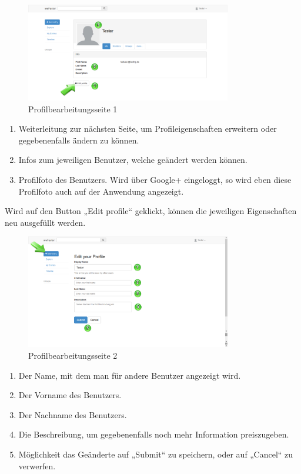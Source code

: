 \begin{figure}[H]
    \centering
    \includegraphics[width=0.8\textwidth]{Bilder/9.png}
    \caption{Profilbearbeitungsseite 1}
    \label{fig:profilbearbeitungsseite1}
\end{figure}


\begin{enumerate}
\item Weiterleitung zur nächsten Seite, um Profileigenschaften erweitern oder gegebenenfalls ändern zu können.
\item Infos zum jeweiligen Benutzer, welche geändert werden können.
\item Profilfoto des Benutzers. Wird über Google+ eingeloggt, so wird eben diese Profilfoto auch auf der Anwendung angezeigt.
\end{enumerate}


Wird auf den Button „Edit profile“ geklickt, können die jeweiligen Eigenschaften neu ausgefüllt werden.

\begin{figure}[H]
    \centering
    \includegraphics[width=0.8\textwidth]{Bilder/10.png}
    \caption{Profilbearbeitungsseite 2 }
    \label{fig:profilbearbeitungsseite2}
\end{figure}


\begin{enumerate}
\item Der Name, mit dem man für andere Benutzer angezeigt wird.
\item Der Vorname des Benutzers.
\item Der Nachname des Benutzers.
\item Die Beschreibung, um gegebenenfalls noch mehr Information preiszugeben.
\item Möglichkeit das Geänderte auf „Submit“ zu speichern, oder auf „Cancel“ zu verwerfen.
\end{enumerate}


